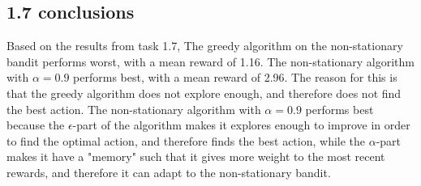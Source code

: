 \documentclass[10pt, a4paper, english]{article}\usepackage[]{graphicx}\usepackage[dvipsnames]{xcolor}
\begin{document}
\subsection{1.7 conclusions}
Based on the results from task 1.7,  The greedy algorithm on the non-stationary bandit performs worst, with a mean reward of 1.16. The non-stationary algorithm with $\alpha = 0.9$ performs best, with a mean reward of 2.96. The reason for this is that the greedy algorithm does not explore enough, and therefore does not find the best action. The non-stationary algorithm with $\alpha = 0.9$ performs best because the $\epsilon$-part of the algorithm makes  it explores enough to improve in order to find the optimal action, and therefore finds the best action, while the $\alpha$-part makes it have a "memory" such that it gives more weight to the most recent rewards, and therefore it can adapt to the non-stationary bandit.
\end{document}
